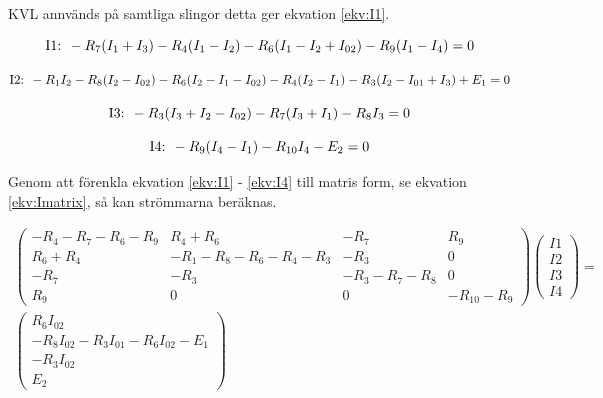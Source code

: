 \documentclass[a4paper,12pt]{article}
\begin{document}
KVL annvänds på samtliga slingor detta ger ekvation \ref{ekv:I1}.

\begin{equation}
\text{I1: }-R_7(I_1+I_3)-R_4(I_1-I_2)-R_6(I_1-I_2+I_{02})-R_9(I_1-I_4)=0 \\
\label{ekv:I1}
\end{equation}

\begin{equation}
\text{I2: }-R_1I_2-R_8(I_2-I_{02})-R_6(I_2-I_1-I_{02})-R_4(I_2-I_1)-R_3(I_2-I_{01}+I_3)+E_1=0 \\
\label{ekv:I2}
\end{equation}

\begin{equation}
\text{I3: }-R_3(I_3+I_2-I_{02})-R_7(I_3+I_1)-R_8I_3=0 \\
\label{ekv:I3}
\end{equation}

\begin{equation}
\text{I4: }-R_9(I_4-I_1)-R_{10}I_4-E_2=0 \\
\label{ekv:I4}
\end{equation}

Genom att förenkla ekvation \ref{ekv:I1} - \ref{ekv:I4} till matris form, se ekvation \ref{ekv:Imatrix}, så kan strömmarna beräknas.

\begin{equation}
\begin{split}
\begin{pmatrix}
  -R_4-R_7-R_6-R_9 & R_4+R_6 & -R_7 & R_9\\
   R_6+R_4 & -R_1-R_8-R_6-R_4-R_3 & -R_3 & 0 \\
  -R_7 & -R_3 & -R_3-R_7-R_8 & 0 \\
   R_9 & 0 & 0 & -R_{10}-R_9
 \end{pmatrix}
 \begin{pmatrix}
    I1 \\
    I2 \\
    I3 \\
    I4
  \end{pmatrix}
 =\\
 \begin{pmatrix}
    R_6I_{02} \\
    -R_8I_{02}-R_3I_{01}-R_6I_{02}-E_1 \\
    -R_3I_{02} \\
    E_2
  \end{pmatrix}
  \end{split}
\label{ekv:Imatrix}
\end{equation}
\end{document}
